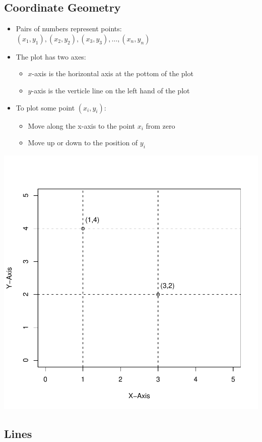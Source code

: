 \documentclass[12pt]{extarticle}
\newcommand{\bi}{\begin{itemize}}
\newcommand{\ei}{\end{itemize}}
\begin{document}
\subsection{Coordinate Geometry}
\bi
\item Pairs of numbers represent points: $(x_1, y_1), (x_2, y_2),
  (x_3, y_3), \ldots, (x_n, y_n)$
\item The plot has two axes:
\bi
\item $x$-axis is the horizontal axis at the pottom of the plot
\item $y$-axis is the verticle line on the left hand of the plot
\ei 
\item To plot some point $(x_i, y_i)$:
\bi
\item Move along the x-axis to the point $x_i$ from zero
\item Move up or down to the position of $y_i$ 
\ei
\ei
\begin{center}
\includegraphics[scale = .8]{graph_example}
\end{center}

\subsection{Lines}
\end{document}
